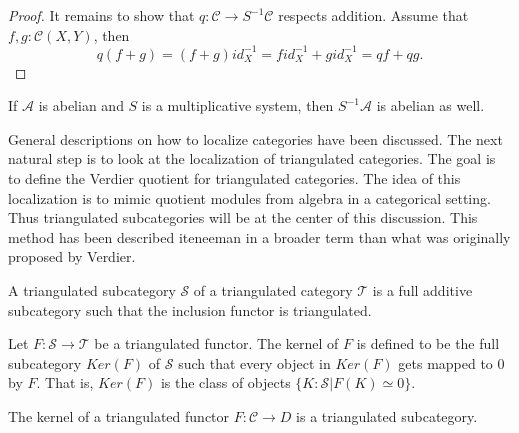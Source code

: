 \begin{proof}
        It remains to show that $q:\mathcal{C}\rightarrow S^{-1}\mathcal{C}$ respects addition. Assume that $f,g:\mathcal{C}(X,Y)$, then
        \begin{equation*}
            q(f+g)=(f+g)id_X^{-1}=fid_X^{-1}+gid_X^{-1}=qf+qg.
        \end{equation*}
    \end{proof}

    \begin{corollary}
        If $\mathcal{A}$ is abelian and $S$ is a multiplicative system, then $S^{-1}\mathcal{A}$ is abelian as well.
    \end{corollary}

    General descriptions on how to localize categories have been discussed. The next natural step is to look at the localization of triangulated categories. The goal is to define the Verdier quotient for triangulated categories. The idea of this localization is to mimic quotient modules from algebra in a categorical setting. Thus triangulated subcategories will be at the center of this discussion. This method has been described ite{neeman} in a broader term than what was originally proposed by Verdier.

    \begin{definition}
        A triangulated subcategory $\mathcal{S}$ of a triangulated category $\mathcal{T}$ is a full additive subcategory such that the inclusion functor is triangulated.
    \end{definition}

    \begin{definition}
        Let $F : \mathcal{S} \rightarrow \mathcal{T}$ be a triangulated functor. The kernel of $F$ is defined to be the full subcategory $Ker(F)$ of $\mathcal{S}$ such that every object in $Ker(F)$ gets mapped to $0$ by $F$. That is, $Ker(F)$ is the class of objects $\{K : \mathcal{S} | F(K)\simeq 0\}$.
    \end{definition}

    \begin{lemma}
        The kernel of a triangulated functor $F:\mathcal{C}\rightarrow{D}$ is a triangulated subcategory.
    \end{lemma}


